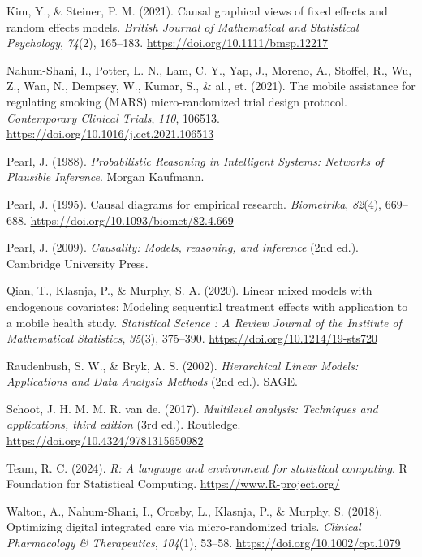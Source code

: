 \documentclass[
  11pt,
  a4paper,
]{article}
\newlength{\cslhangindent}
\newenvironment{CSLReferences}[2] %
 {\begin{list}{}{%
  \setlength{\itemindent}{0pt}
  \setlength{\leftmargin}{0pt}
  \setlength{\parsep}{0pt}
  \ifodd #1
   \setlength{\leftmargin}{\cslhangindent}
   \setlength{\itemindent}{-1\cslhangindent}
  \fi
  \setlength{\itemsep}{#2\baselineskip}}}
 {\end{list}}
\begin{document}
\begin{CSLReferences}{1}{0}
Kim, Y., \& Steiner, P. M. (2021). Causal graphical views of fixed
effects and random effects models. \emph{British Journal of Mathematical
and Statistical Psychology}, \emph{74}(2), 165--183.
\url{https://doi.org/10.1111/bmsp.12217}

Nahum-Shani, I., Potter, L. N., Lam, C. Y., Yap, J., Moreno, A.,
Stoffel, R., Wu, Z., Wan, N., Dempsey, W., Kumar, S., \& al., et.
(2021). The mobile assistance for regulating smoking (MARS)
micro-randomized trial design protocol. \emph{Contemporary Clinical
Trials}, \emph{110}, 106513.
\url{https://doi.org/10.1016/j.cct.2021.106513}

Pearl, J. (1988). \emph{Probabilistic Reasoning in Intelligent Systems:
Networks of Plausible Inference}. Morgan Kaufmann.

Pearl, J. (1995). Causal diagrams for empirical research.
\emph{Biometrika}, \emph{82}(4), 669--688.
\url{https://doi.org/10.1093/biomet/82.4.669}

Pearl, J. (2009). \emph{Causality: Models, reasoning, and inference}
(2nd ed.). Cambridge University Press.

Qian, T., Klasnja, P., \& Murphy, S. A. (2020). Linear mixed models with
endogenous covariates: Modeling sequential treatment effects with
application to a mobile health study. \emph{Statistical Science : A
Review Journal of the Institute of Mathematical Statistics},
\emph{35}(3), 375--390. \url{https://doi.org/10.1214/19-sts720}

Raudenbush, S. W., \& Bryk, A. S. (2002). \emph{Hierarchical Linear
Models: Applications and Data Analysis Methods} (2nd ed.). SAGE.

Schoot, J. H. M. M. R. van de. (2017). \emph{Multilevel analysis:
Techniques and applications, third edition} (3rd ed.). Routledge.
\url{https://doi.org/10.4324/9781315650982}

Team, R. C. (2024). \emph{R: A language and environment for statistical
computing}. R Foundation for Statistical Computing.
\url{https://www.R-project.org/}

Walton, A., Nahum-Shani, I., Crosby, L., Klasnja, P., \& Murphy, S.
(2018). Optimizing digital integrated care via micro-randomized trials.
\emph{Clinical Pharmacology \& Therapeutics}, \emph{104}(1), 53--58.
\url{https://doi.org/10.1002/cpt.1079}


\end{CSLReferences}
\end{document}
